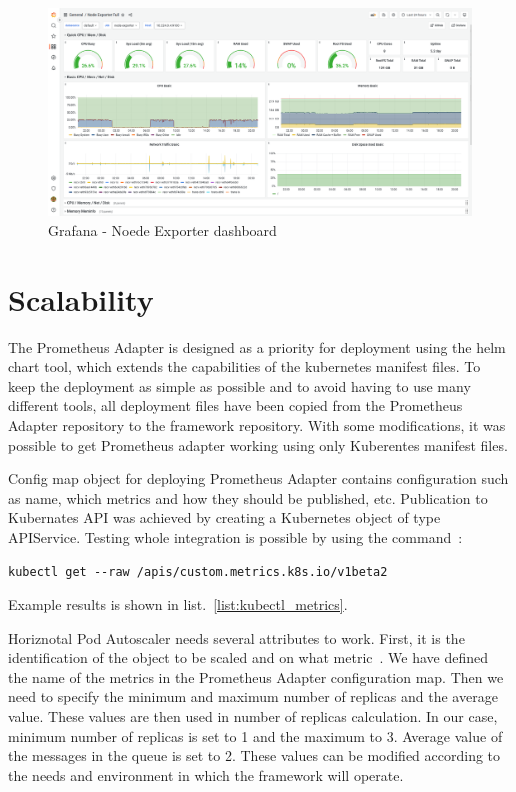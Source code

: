 \begin{figure}[H]
    \centering
    \includegraphics[width=\linewidth]{other-fig/grafana.png}
    \caption{Grafana - Noede Exporter dashboard}
    \label{fig:grafana_node_exporter}
\end{figure}


\section{Scalability}
\label{section:scalability}

The Prometheus Adapter is designed as a priority for deployment using the helm chart tool, which extends the capabilities of the kubernetes manifest files. To keep the deployment as simple as possible and to avoid having to use many different tools, all deployment files have been copied from the Prometheus Adapter repository to the framework repository. With some modifications, it was possible to get Prometheus adapter working using only Kuberentes manifest files.

Config map object for deploying Prometheus Adapter contains configuration such as name, which metrics and how they should be published, etc. Publication to Kubernates API was achieved by creating a Kubernetes object of type APIService. Testing whole integration is possible by using the command~\cite{PrometheusAdapter}: 

\begin{lstlisting}
kubectl get --raw /apis/custom.metrics.k8s.io/v1beta2 
\end{lstlisting}

\noindent Example results is shown in list.~\ref{list:kubectl_metrics}.

Horiznotal Pod Autoscaler needs several attributes to work. First, it is the identification of the object to be scaled and on what metric~\cite{HorizontalPodAutoscaler}. We have defined the name of the metrics in the Prometheus Adapter configuration map. Then we need to specify the minimum and maximum number of replicas and the average value. These values are then used in number of replicas calculation. In our case, minimum number of replicas is set to 1 and the maximum to 3. Average value of the messages in the queue is set to 2. These values can be modified according to the needs and environment in which the framework will operate.~\cite{HorizontalPodAutoscaler}

